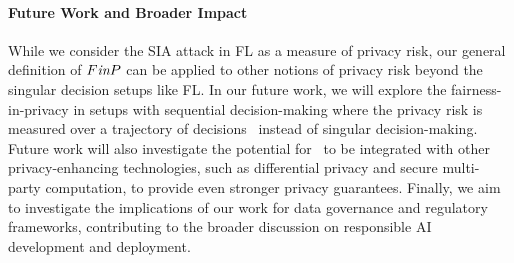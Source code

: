 \paragraph{\textbf{Future Work and Broader Impact}}
While we consider the SIA attack in FL as a measure of privacy risk, our general definition of $F\emph{in}P$ can be applied to other notions of privacy risk beyond the singular decision setups like FL. In our future work, we will explore the fairness-in-privacy in setups with sequential decision-making where the privacy risk is measured over a trajectory of decisions~\cite{zhao2024fairo} instead of singular decision-making. Future work will also investigate the potential for \sysname\ to be integrated with other privacy-enhancing technologies, such as differential privacy and secure multi-party computation, to provide even stronger privacy guarantees. Finally, we aim to investigate the implications of our work for data governance and regulatory frameworks, contributing to the broader discussion on responsible AI development and deployment.